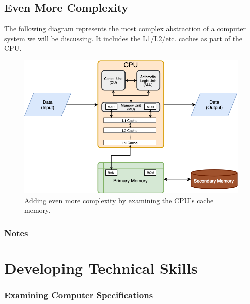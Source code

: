     \pagebreak
    \subsection*{Even More Complexity}
    The following diagram represents the most complex abstraction of a computer system we will be discussing. It includes the L1/L2/etc. caches as part of the CPU.

    \begin{figure}[h]
        \centering
        \includegraphics[width=0.75\boxwidth]{Extras/computer_abstraction_complex2}
        \caption{Adding even more complexity by examining the CPU's cache memory.}
    \end{figure}

    \subsubsection*{Notes}

    \vfill
    

    \pagebreak
    
    \section*{Developing Technical Skills}
    \subsubsection*{Examining Computer Specifications}

